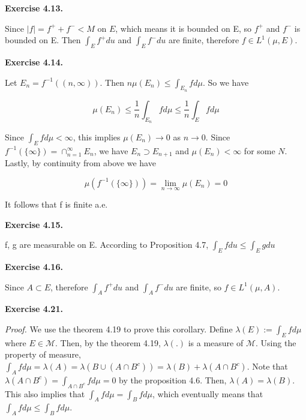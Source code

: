 \documentclass[letterpaper,12pt]{article}
\theoremstyle{definition}
\begin{document}
\begin{spacing}{1.3}{}
\textbf{Exercise 4.13.}

Since $|f| = f^{+} + f^{-} < M$ on $E$, which means it is bounded on E, so $f^{+}$ and $f^{-}$ is bounded on E. Then $\int_{E}f^{+}du$ and $\int_{E}f^{-}du$ are finite, therefore $f \in L^{1}(\mu, E)$.

\textbf{Exercise 4.14.}

Let $E_n = f^{-1}((n,\infty))$. Then $n\mu(E_n) \leq \int_{E_n} fd\mu$. So we have

$$ \mu(E_n) \leq \frac{1}{n} \int_{E_n}  fd\mu \leq  \frac{1}{n} \int_{E}  fd\mu  $$

Since  $\int_{E}  fd\mu < \infty$, this implies $\mu(E_n) \rightarrow 0$ as $n \rightarrow 0$. Since $f^{-1}(\{\infty\}) = \cap_{n=1}^{\infty}E_{n}$, we have $E_{n} \supset E_{n+1}$ and $\mu(E_n) < \infty$ for some $N$. Lastly, by continuity from above we have

$$\mu(f^{-1}(\{\infty\})) = \lim_{n \rightarrow \infty} \mu(E_n) = 0$$

It follows that f is finite a.e.

\textbf{Exercise 4.15.}

f, g are measurable on E. According to Proposition 4.7, $\int_{E}f du \leq \int_{E}g du$

\textbf{Exercise 4.16.}

Since $A \subset E$, therefore $\int_{A}f^{+} du$ and $\int_{A}f^{-} du$ are finite, so $f \in L^{1}(\mu, A)$.

\textbf{Exercise 4.21.}
 
 \emph{Proof. } We use the theorem 4.19 to prove this corollary. Define $\lambda (E) := \int_{E} f d\mu$ where $E \in \mathcal{M}$. Then, by the theorem 4.19, $\lambda(.)$ is a measure of $\mathcal{M}$. Using the property of measure, $\int_{A} f d \mu = \lambda(A) = \lambda(B \cup (A \cap B^{c})) = \lambda(B) + \lambda(A \cap B^{c})$. Note that $\lambda(A \cap B^{c}) = \int_{A \cap B^{c}} f d\mu =0$ by the proposition 4.6. Then, $\lambda(A) = \lambda(B)$. This also implies that $\int_{A}f d\mu = \int_{B}f d\mu$, which eventually means that $\int_{A}f d\mu \leq \int_{B}f d\mu$. \  \\
 \end{spacing}
\end{document}
